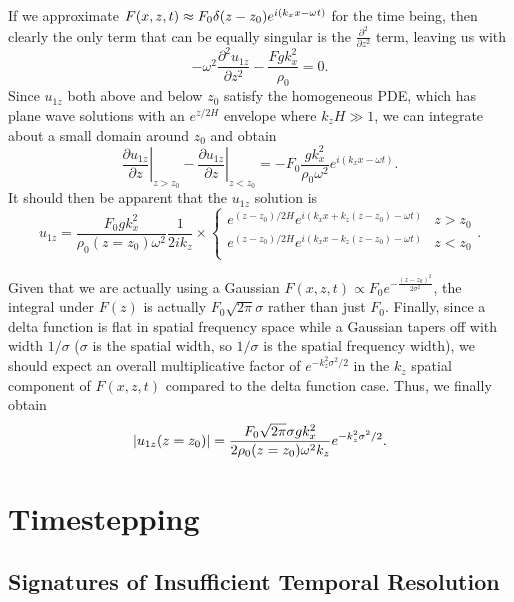 \documentclass[11pt,
        usenames, %
        dvipsnames %
    ]{report}
\newcommand*{\pd}[2]{\frac{\partial#1}{\partial#2}}
\newcommand*{\ptd}[2]{\frac{\partial^2 #1}{\partial#2^2}}
\newcommand*{\at}[1]{\left.#1\right|}
\DeclarePairedDelimiter\abs{\lvert}{\rvert}
\DeclarePairedDelimiter\p{\lparen}{\rparen}
\begin{document}
If we approximate $F(x, z, t) \approx F_0\delta\p*{z - z_0} e^{i(k_xx - \omega t)}$
for the time being, then clearly the only term that can be equally singular is
the $\ptd{}{z}$ term, leaving us with
\begin{equation}
    -\omega^2 \ptd{u_{1z}}{z} - \frac{Fgk_x^2}{\rho_0} = 0.
\end{equation}
Since $u_{1z}$ both above and below $z_0$ satisfy the homogeneous PDE, which has
plane wave solutions with an $e^{z/2H}$ envelope where $k_zH \gg 1$, we can
integrate about a small domain around $z_0$ and obtain
\begin{equation}
    \at{\pd{u_{1z}}{z}}_{z > z_0} - \at{\pd{u_{1z}}{z}}_{z < z_0}
        = -F_0\frac{gk_x^2}{\rho_0\omega^2}e^{i(k_xx - \omega t)}.
\end{equation}
It should then be apparent that the $u_{1z}$ solution is
\begin{equation}
    u_{1z} = \frac{F_0gk_x^2}{\rho_0(z = z_0)\omega^2}\frac{1}{2ik_z} \times
    \begin{cases}
        e^{(z - z_0)/2H}e^{i(k_xx + k_z(z - z_0) - \omega t)} & z > z_0\\
        e^{(z - z_0)/2H}e^{i(k_xx - k_z(z - z_0) - \omega t)} & z < z_0\\
    \end{cases}.
\end{equation}

Given that we are actually using a Gaussian $F(x, z, t) \propto F_0e^{-\frac{(z
- z_0)^2}{2\sigma^2}}$, the integral under $F(z)$ is actually
$F_0\sqrt{2\pi}\sigma$ rather than just $F_0$. Finally, since a delta function
is flat in spatial frequency space while a Gaussian tapers off with width
$1/\sigma$ ($\sigma$ is the spatial width, so $1/\sigma$ is the spatial
frequency width), we should expect an overall multiplicative factor of
$e^{-k_z^2\sigma^2 / 2}$ in the $k_z$ spatial component of $F(x, z, t)$ compared
to the delta function case. Thus, we finally obtain
\begin{equation}
    \abs*{u_{1z}(z = z_0)} = \frac{F_0\sqrt{2\pi}\sigma gk_x^2}{
        2\rho_0\p*{z = z_0}\omega^2 k_z}e^{-k_z^2\sigma^2/2}.
\end{equation}

\section{Timestepping}

\subsection{Signatures of Insufficient Temporal Resolution}
\end{document}

